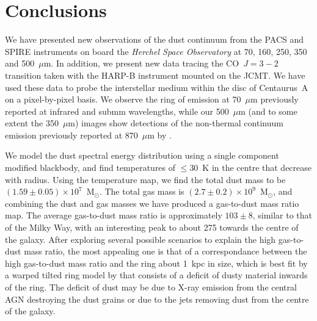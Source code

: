 \section{Conclusions}\label{sec:conclusions2}
We have presented new observations of the dust continuum from the PACS and SPIRE instruments on board the \emph{Herchel Space Observatory} at 70, 160, 250, 350 and 500~$\mu$m.  In addition, we present new data tracing the CO~$J=3-2$ transition taken with the HARP-B instrument mounted on the JCMT.  We have used these data to probe the interstellar medium within the disc of Centaurus~A on a pixel-by-pixel basis. We observe the ring of emission at 70~$\mu$m previously reported at infrared and submm wavelengths, while our 500~$\mu$m (and to some extent the 350~$\mu$m) images show detections of the non-thermal continuum emission previously reported at 870~$\mu$m by \citet{2008A&A...490...77W}.

We model the dust spectral energy distribution using a single component modified blackbody, and find temperatures of $\le 30$~K in the centre that decrease with radius.  Using the temperature map, we find the total dust mass to be $(1.59 \pm 0.05) \times 10^{7}$~M$_{\odot}$.  The total gas mass is $(2.7 \pm 0.2)\times 10^{9}$~M$_{\odot}$, and combining the dust and gas masses we have produced a gas-to-dust mass ratio map.  The average gas-to-dust mass ratio is approximately $103 \pm 8$, similar to that of the Milky Way, with an interesting peak to about 275 towards the centre of the galaxy.  After exploring several possible scenarios to explain the high gas-to-dust mass ratio, the most appealing one is that of a correspondance between the high gas-to-dust mass ratio and the ring about 1~kpc in size, which is best fit by a warped tilted ring model by \citet{2006ApJ...645.1092Q} that consists of a deficit of dusty material inwards of the ring.  The deficit of dust may be due to X-ray emission from the central AGN destroying the dust grains or due to the jets removing dust from the centre of the galaxy.

